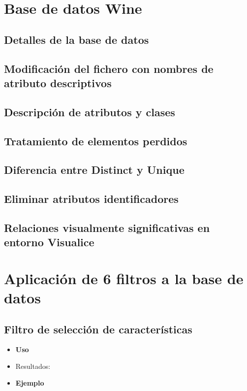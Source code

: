 \newpage
\section{Base de datos Wine}
 	
	\subsection{Detalles de la base de datos}
	
	\subsection{Modificación del fichero con nombres de atributo descriptivos}

	\subsection{Descripción de atributos y clases}

	\subsection{Tratamiento de elementos perdidos}

	\subsection{Diferencia entre Distinct y Unique}

	\subsection{Eliminar atributos identificadores}
	
	\subsection{Relaciones visualmente significativas en entorno Visualice}
	

\newpage
\section{Aplicación de 6 filtros a la base de datos}
 	
	\subsection{Filtro de selección de características}
	\begin{itemize}
		\item \textbf{Uso}
		\item Resultados:
		\item \textbf{Ejemplo}
	\end{itemize}

